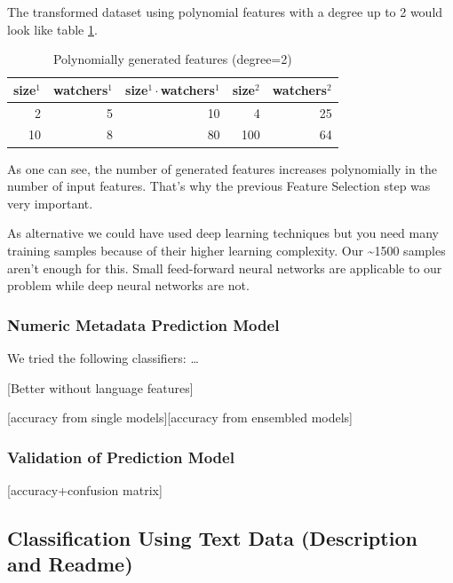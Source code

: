 \documentclass[%
a4paper,
DIV12,
2.5headlines,
bigheadings,
titlepage,
openbib,
]{scrartcl}
\begin{document}
The transformed dataset using polynomial features with a degree up to 2 would look like table \ref{example-feature-engineering-transformed}.

\begin{table}[]
\label{example-feature-engineering-transformed}
\centering
\caption{Polynomially generated features (degree=2)}
\begin{tabular}{|r|r|r|r|r|}
\hline
size$^1$ & watchers$^1$ & size$^1\cdot$watchers$^1$ & size$^2$ & watchers$^2$ \\ \hline
2 & 5 & 10 & 4 & 25 \\ \hline
10 & 8 & 80 & 100 & 64 \\ \hline
\end{tabular}
\end{table}

As one can see, the number of generated features increases polynomially in the number of input features.
That's why the previous Feature Selection step was very important.

As alternative we could have used deep learning techniques but you need many training samples because of their higher learning complexity.
Our \textasciitilde{}1500 samples aren't enough for this.
Small feed-forward neural networks are applicable to our problem while deep neural networks are not.

\subsubsection{Numeric Metadata Prediction
Model}\label{numeric-metadata-prediction-model}

We tried the following classifiers: \ldots{}

{[}Better without language features{]}

{[}accuracy from single models{]}{[}accuracy from ensembled models{]}

\subsubsection{Validation of Prediction
Model}\label{validation-of-prediction-model}

{[}accuracy+confusion matrix{]}

\subsection{Classification Using Text Data (Description and
Readme)}\label{classification-using-text-data-description-and-readme}
\end{document}
